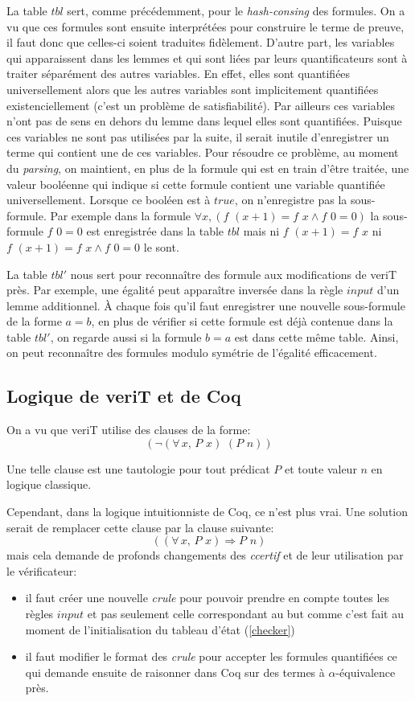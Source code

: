 \documentclass[11pt]{article}
\begin{document}
La table $tbl$ sert, comme précédemment, pour le \textit{hash-consing} des formules. On a vu que ces formules sont ensuite interprétées pour construire le terme de preuve, il faut donc que celles-ci soient traduites fidèlement. D'autre part, les variables qui apparaissent dans les lemmes et qui sont liées par leurs quantificateurs sont à traiter séparément des autres variables. En effet, elles sont quantifiées universellement alors que les autres variables sont implicitement quantifiées existenciellement (c'est un problème de satisfiabilité). Par ailleurs ces variables n'ont pas de sens en dehors du lemme dans lequel elles sont quantifiées. Puisque ces variables ne sont pas utilisées par la suite, il serait inutile d'enregistrer un terme qui contient une de ces variables.
Pour résoudre ce problème, au moment du \textit{parsing}, on maintient, en plus de la formule qui est en train d'être traitée, une valeur booléenne qui indique si cette formule contient une variable quantifiée universellement. Lorsque ce booléen est à $true$, on n'enregistre pas la sous-formule. Par exemple dans la formule $\forall x, (f \,\, (x+1) = f \,\, x \wedge f\,\,0 = 0)$ la sous-formule $f \,\, 0 = 0$ est enregistrée dans la table $tbl$ mais ni $f\,\,(x+1) = f\,\,x$ ni $f \,\, (x+1) = f \,\, x \wedge f\,\,0 = 0$ le sont.\medbreak

La table $tbl'$ nous sert pour reconnaître des formule aux modifications de veriT près. Par exemple, une égalité  peut apparaître inversée  dans la règle $input$ d'un lemme additionnel. À chaque fois qu'il faut enregistrer une nouvelle sous-formule de la forme $a = b$, en plus de vérifier si cette formule est déjà contenue dans la table $tbl'$, on regarde aussi si la formule $b = a$ est dans cette même table. Ainsi, on peut reconnaître des formules modulo symétrie de l'égalité efficacement.

\subsection{Logique de veriT et de Coq}
On a vu que veriT utilise des clauses de la forme: 
\[  (\neg (\forall \, x, \, P \,\, x) \,\, (P \,\, n)) \]

Une telle clause est une tautologie pour tout prédicat $P$ et toute valeur $n$ en logique classique. \medbreak 

Cependant, dans la logique intuitionniste de Coq, ce n'est plus vrai. Une solution serait de remplacer cette clause par la clause suivante:
\[   ((\forall \, x, \, P\,\, x) \Rightarrow P \,\, n) \]
mais cela demande de profonds changements des \textit{ccertif} et de leur utilisation par le vérificateur: 
\begin{itemize}

\item il faut créer une nouvelle \textit{crule} pour pouvoir prendre en compte toutes les règles $input$ et pas seulement celle correspondant au but comme c'est fait au moment de l'initialisation du tableau d'état (\ref{checker})
\item il faut modifier le format des \textit{crule} pour accepter les formules quantifiées ce qui demande ensuite de raisonner dans Coq sur des termes à $\alpha$-équivalence près.
\end{itemize}
\end{document}
